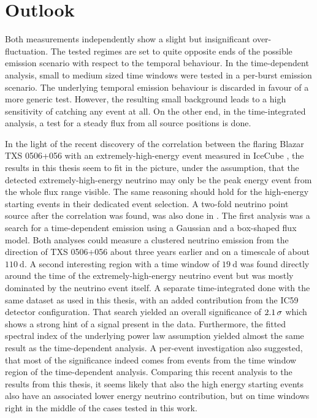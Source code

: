 \chapter{Outlook}

Both measurements independently show a slight but insignificant over-fluctuation.
The tested regimes are set to quite opposite ends of the possible emission scenario with respect to the temporal behaviour.
In the time-dependent analysis, small to medium sized time windows were tested in a per-burst emission scenario.
The underlying temporal emission behaviour is discarded in favour of a more generic test.
However, the resulting small background leads to a high sensitivity of catching any event at all.
On the other end, in the time-integrated analysis, a test for a steady flux from all source positions is done.

In the light of the recent discovery of the correlation between the flaring Blazar TXS 0506+056 with an extremely-high-energy event measured in IceCube \cite{IceCube:2018dnn}, the results in this thesis seem to fit in the picture, under the assumption, that the detected extremely-high-energy neutrino may only be the peak energy event from the whole flux range visible.
The same reasoning should hold for the high-energy starting events in their dedicated event selection.
A two-fold neutrino point source after the correlation was found, was also done in \cite{IceCube:2018cha}.
The first analysis was a search for a time-dependent emission using a Gaussian and a box-shaped flux model.
Both analyses could measure a clustered neutrino emission from the direction of TXS 0506+056 about three years earlier and on a timescale of about $\SI{110}{\day}$.
A second interesting region with a time window of $\SI{19}{\day}$ was found directly around the time of the extremely-high-energy neutrino event but was mostly dominated by the neutrino event itself.
A separate time-integrated done with the same dataset as used in this thesis, with an added contribution from the IC59 detector configuration.
That search yielded an overall significance of $\num{2.1}\,\sigma$ which shows a strong hint of a signal present in the data.
Furthermore, the fitted spectral index of the underlying power law assumption yielded almost the same result as the time-dependent analysis.
A per-event investigation also suggested, that most of the significance indeed comes from events from the time window region of the time-dependent analysis.
Comparing this recent analysis to the results from this thesis, it seems likely that also the high energy starting events also have an associated lower energy neutrino contribution, but on time windows right in the middle of the cases tested in this work.

